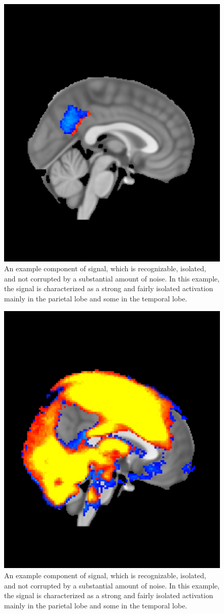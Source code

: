 \begin{figure}[H]                 
	\includegraphics[width=.65\textwidth]{figures/Results/Neg_70-92}  
	\caption{An example component of signal, which is recognizable, isolated, and not corrupted by a substantial amount of noise. In this example, the signal is characterized as a strong and fairly isolated activation mainly in the parietal lobe and some in the temporal lobe.}
	\label{fig:res:diffneg} 
\end{figure}

\begin{figure}[H]                 
	\includegraphics[width=.65\textwidth]{figures/Results/Pos_10-30}  
	\caption{An example component of signal, which is recognizable, isolated, and not corrupted by a substantial amount of noise. In this example, the signal is characterized as a strong and fairly isolated activation mainly in the parietal lobe and some in the temporal lobe.}
	\label{fig:res:diffpos} 
\end{figure}


